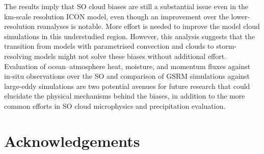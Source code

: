 \documentclass[12pt,a4paper]{article}
\begin{document}
The results imply that SO cloud biases are still a substantial issue even in the
km-scale resolution ICON model, even though an improvement over the
lower-resolution reanalyses is notable. More effort is needed to improve the
model cloud simulations in this understudied region. However, this analysis suggests that the
transition from models with parametrised convection and clouds to
storm-resolving models might not solve these biases without additional effort.
Evaluation of ocean--atmosphere heat, moisture, and momentum fluxes against in-situ observations over the SO and comparison of GSRM simulations against
large-eddy simulations are two potential avenues for future research that could
elucidate the physical mechanisms behind the biases, in addition to the more
common efforts in SO cloud microphysics and precipitation evaluation.

\fontsize{12pt}{14pt}\selectfont
\section*{Acknowledgements}
\end{document}
